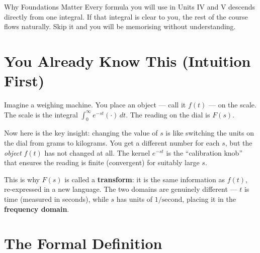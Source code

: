 \documentclass[12pt,a4paper]{article}
\begin{document}
\begin{learnbox}{Why Foundations Matter}
Every formula you will use in Units IV and V descends directly from one
integral. If that integral is clear to you, the rest of the course flows
naturally. Skip it and you will be memorising without understanding.
\end{learnbox}

\section{You Already Know This (Intuition First)}

Imagine a weighing machine. You place an object --- call it $f(t)$ --- on the
scale. The scale is the integral $\int_0^\infty e^{-st}(\cdot)\,dt$. The
reading on the dial is $F(s)$.

Now here is the key insight: changing the value of $s$ is like switching the
units on the dial from grams to kilograms. You get a different number for each
$s$, but the \emph{object} $f(t)$ has not changed at all. The kernel $e^{-st}$
is the ``calibration knob'' that ensures the reading is finite (convergent) for
suitably large $s$.

This is why $F(s)$ is called a \textbf{transform}: it is the same information
as $f(t)$, re-expressed in a new language. The two domains are genuinely
different --- $t$ is time (measured in seconds), while $s$ has units of
$1/\text{second}$, placing it in the \textbf{frequency domain}.

\section{The Formal Definition}
\end{document}
